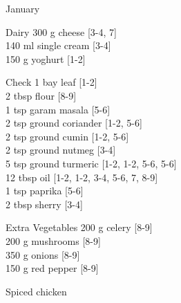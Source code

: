 \begin{menu}{January}
\begin{shoppinglist}{Dairy}
      300 g cheese 
        {\scriptsize[3-4, 7]}\\
      140 ml single cream 
        {\scriptsize[3-4]}\\
      150 g yoghurt 
        {\scriptsize[1-2]}\\
      \end{shoppinglist}%
      \par\vfil %
      \vfil\clearpage %
      \begin{shoppinglist}{Check}
      1  bay leaf 
        {\scriptsize[1-2]}\\
      2 tbsp flour 
        {\scriptsize[8-9]}\\
      1 tsp garam masala 
        {\scriptsize[5-6]}\\
      2 tsp ground coriander 
        {\scriptsize[1-2, 5-6]}\\
      2 tsp ground cumin 
        {\scriptsize[1-2, 5-6]}\\
      2 tsp ground nutmeg 
        {\scriptsize[3-4]}\\
      5 tsp ground turmeric 
        {\scriptsize[1-2, 1-2, 5-6, 5-6]}\\
      12 tbsp oil 
        {\scriptsize[1-2, 1-2, 3-4, 5-6, 7, 8-9]}\\
      1 tsp paprika 
        {\scriptsize[5-6]}\\
      2 tbsp sherry 
        {\scriptsize[3-4]}\\
      \end{shoppinglist}%
      \begin{shoppinglist}{Extra Vegetables}
      200 g celery 
        {\scriptsize[8-9]}\\
      200 g mushrooms 
        {\scriptsize[8-9]}\\
      350 g onions 
        {\scriptsize[8-9]}\\
      150 g red pepper 
        {\scriptsize[8-9]}\\
      \end{shoppinglist}%
      \par\vfil %
    \vfil\clearpage
  
    \begin{recipe}{2}{Spiced chicken}%
    

\end{recipe}
\end{menu}
